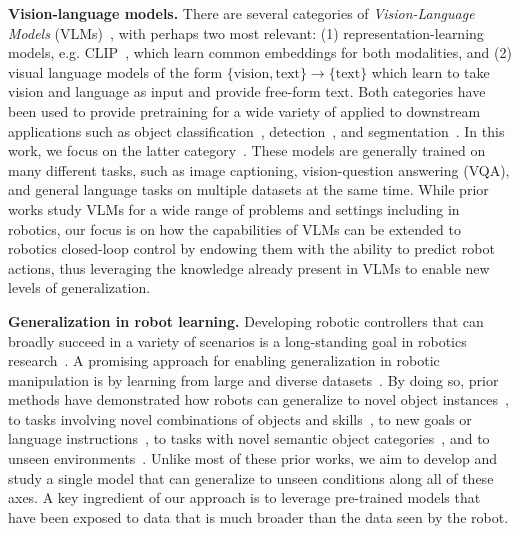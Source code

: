 \documentclass[11pt, a4paper, logo, copyright]{deepmind}
\begin{document}
\textbf{Vision-language models.}
There are several categories of \emph{Vision-Language Models} (VLMs)~\citep{gan2022vision}, with perhaps two most relevant: (1) representation-learning models, e.g. CLIP~\citep{radford2021learning}, which learn common embeddings for both modalities, and (2) visual language models of the form $\{\text{vision},\text{text}\} \rightarrow \{\text{text}\}$ which learn to take vision and language as input and provide free-form text. 
Both categories have been used to provide pretraining for a wide variety of applied to downstream applications such as object classification~\citep{radford2021learning}, detection~\citep{gu2021open}, and segmentation~\citep{ghiasi2021open}.
In this work, we focus on the latter category~\citep{alayrac2022flamingo, chen2023pali, chen2023palix, driess2023palm, li2019visualbert, lu2019vilbert, hao2022language, li2023blip}. 
These models are generally trained on many different tasks, such as image captioning, vision-question answering (VQA), and general language tasks on multiple datasets at the same time.
While prior works study VLMs for a wide range of problems and settings including in robotics, our focus is on how the capabilities of VLMs 
can be extended to robotics closed-loop control by endowing them with the ability to predict robot actions, thus leveraging the knowledge already present in VLMs to enable new levels of generalization.

\textbf{Generalization in robot learning.} Developing robotic controllers that can broadly succeed in a variety of scenarios is a long-standing goal in robotics research~\citep{smith1973design,kaelbling2020foundation}. A promising approach for enabling generalization in robotic manipulation is by learning from large and diverse datasets~\citep{pinto2016supersizing,levine2018learning,dasari2019robonet}. By doing so, prior methods have demonstrated how robots can generalize to novel object instances~\citep{pinto2016supersizing,mahler2017dex,levine2018learning,finn2017deep,young2021visual}, to tasks involving novel combinations of objects and skills~\citep{finn2017one,yu2018one,james2018task,dasari2021transformers,jang2022bc}, to new goals or language instructions~\citep{pong2019skew,nair2022learning,jang2022bc,jiang2022vima,mees2022matters,liu2022instruction}, to tasks with novel semantic object categories~\citep{shridhar2021cliport,stone2023open}, and to unseen environments~\citep{hansen2020self,cui2022play,du2023behavior}. Unlike most of these prior works, we aim to develop and study a single model that can generalize to unseen conditions along all of these axes. A key ingredient of our approach is to leverage pre-trained models that have been exposed to data that is much broader than the data seen by the robot.
\end{document}
